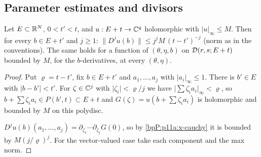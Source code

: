 \subsection{Parameter estimates and divisors}\label{bpP:p11a:sec-param}

\begin{lemma}\label{bpP:p11a:param-cauchy}
Let $E\subset\mathbb{R}^N$, $0<t'<t$, and $u:E+t\to\mathbb{C}^q$ holomorphic with $\lvert u\rvert_\infty\le M$. Then for every $b\in E+t'$ and $j\ge1$: $\lVert D^ju(b)\rVert\le j^j M\,(t-t')^{-j}$ (norm as in the conventions). The same holds for a function of $(\theta,\eta,b)$ on $\mathcal D(r,s;E+t)$ bounded by $M$, for the $b$-derivatives, at every $(\theta,\eta)$.
\end{lemma}
\begin{proof}
\label{stepP:p11a:pc-poly} Put $\varrho=t-t'$, fix $b\in E+t'$ and $a_1,\dots,a_j$ with $\lvert a_i\rvert_\infty\le1$. There is $b'\in E$ with $\lvert b-b'\rvert<t'$. For $\zeta\in\mathbb{C}^j$ with $\lvert\zeta_i\rvert<\varrho/j$ we have $\lvert\sum\zeta_ia_i\rvert_\infty<\varrho$, so $b+\sum\zeta_ia_i\in P(b',t)\subset E+t$ and $G(\zeta)=u(b+\sum\zeta_ia_i)$ is holomorphic and bounded by $M$ on this polydisc.

\label{stepP:p11a:pc-iter} $D^ju(b)(a_1,\dots,a_j)=\partial_{\zeta_1}\cdots\partial_{\zeta_j}G(0)$, so by \ref{bpP:p11a:x-cauchy} it is bounded by $M(j/\varrho)^j$. For the vector-valued case take each component and the max norm.
\end{proof}

